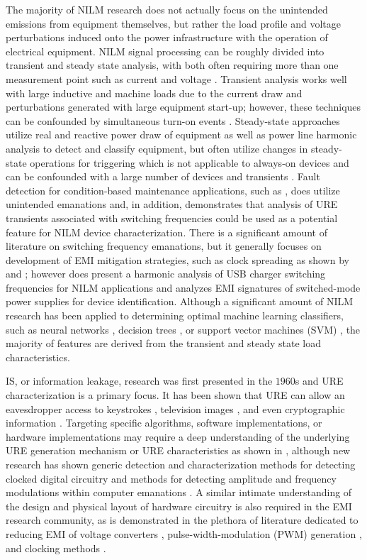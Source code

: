 The majority of NILM research does not actually focus on the unintended emissions from equipment themselves, but rather the load profile and voltage perturbations induced onto the power infrastructure with the operation of electrical equipment.  NILM signal processing can be roughly divided into transient and steady state analysis, with both often requiring more than one measurement point such as current and voltage \cite{Dinesh2016}.  Transient analysis works well with large inductive and machine loads due to the current draw and perturbations generated with large equipment start-up; however, these techniques can be confounded by simultaneous turn-on events \cite{Chang2012}.  Steady-state approaches utilize real and reactive power draw of equipment as well as power line harmonic analysis to detect and classify equipment, but often utilize changes in steady-state operations for triggering which is not applicable to always-on devices and can be confounded with a large number of devices and transients \cite{Laughman2003}.  Fault detection for condition-based maintenance applications, such as \cite{Benbouzid2000}, does utilize unintended emanations and, in addition, \cite{Stagner2014} demonstrates that analysis of URE transients associated with switching frequencies could be used as a potential feature for NILM device characterization.  There is a significant amount of literature on switching frequency emanations, but it generally focuses on development of EMI mitigation strategies, such as clock spreading as shown by \cite{Hardin1994} and \cite{Hsiang-Hui2003}; however \cite{Cooke2016} does present a harmonic analysis of USB charger switching frequencies for NILM applications and \cite{Gulati2014} analyzes EMI signatures of switched-mode power supplies for device identification.  Although a significant amount of NILM research has been applied to determining optimal machine learning classifiers, such as neural networks \cite{Srinivasan2006}, decision trees \cite{Gillis2016}, or support vector machines (SVM) \cite{Duarte2012}, the majority of features are derived from the transient and steady state load characteristics. 

IS, or information leakage, research was first presented in the $1960$s \cite{Zaji2014} and URE characterization is a primary focus.  It has been shown that URE can allow an eavesdropper access to keystrokes \cite{Vuagnoux2009}, television images \cite{Kuhn2013, Enev2011}, and even cryptographic information \cite{Hayashi2013a}.  Targeting specific algorithms, software implementations, or hardware implementations may require a deep understanding of the underlying URE generation mechanism or URE characteristics as shown in \cite{Zaji2014}, although new research has shown generic detection and characterization methods for detecting clocked digital circuitry \cite{Stagner2014} and methods for detecting amplitude and frequency modulations within computer emanations \cite{Prvulovic2017}.  A similar intimate understanding of the design and physical layout of hardware circuitry is also required in the EMI research community, as is demonstrated in the plethora of literature dedicated to reducing EMI of voltage converters \cite{Liu2007}, pulse-width-modulation (PWM) generation \cite{Skibinski1999}, and clocking methods \cite{Zhou2011}. 


